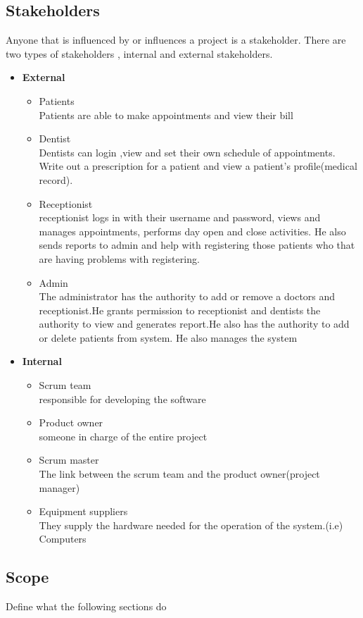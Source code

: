 \documentclass[12pt]{article}
\begin{document}
\subsection{Stakeholders}
Anyone that is influenced by or influences a project is a stakeholder. There are two types of stakeholders , internal and external stakeholders.
\begin{itemize}
\item \textbf{External}
\begin{itemize}
\item Patients\\
Patients are able to make appointments and view their bill 
\item Dentist\\
Dentists can login ,view and set their own schedule of appointments. Write      out a prescription for a patient and view a patient's profile(medical record).
\item Receptionist\\
receptionist logs in with their username and password, views and manages  appointments, performs day open and close activities. He also sends reports to admin and help with registering those patients who that are having problems with registering.
\item Admin \\
The administrator has the authority to add or remove a doctors and receptionist.He grants permission to receptionist  and  dentists the authority to view and generates report.He also has the authority to add or delete patients from system. He also manages the system
\end{itemize}
\item \textbf{Internal}
\begin{itemize}
\item  Scrum team \\
responsible for developing the software
\item Product owner\\
someone in charge of the entire project
\item Scrum master \\
 The link between the scrum team and the product owner(project manager)
\item Equipment suppliers \\
They supply the hardware needed for the operation of the system.(i.e) Computers
\end{itemize}
\end{itemize}
\subsection{Scope}
Define what the following sections do
\end{document}
